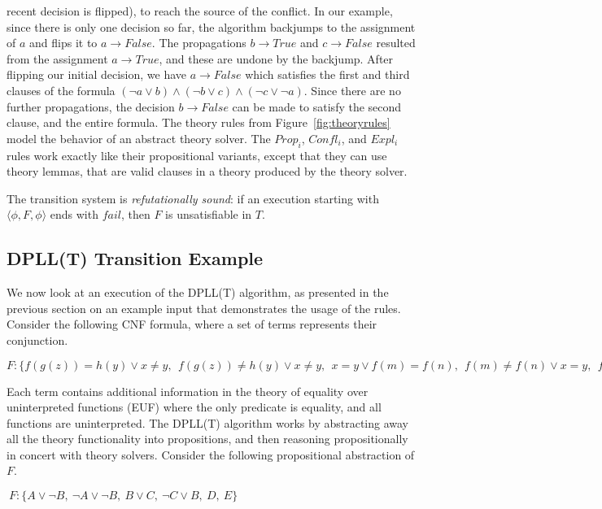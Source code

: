 \documentclass{article}
\begin{document}
	recent decision is flipped), to 
	reach the source of the conflict.
	In our example, since there is only 
	one decision so far, the algorithm
	backjumps to the assignment of 
	$a$ and flips it to $a \to False$. The 
	propagations $b \to True$ and $c \to 
	False$ resulted from the assignment 
	$a \to True$, and these are undone
	by the backjump. After flipping our 
	initial decision, we have $a \to 
	False$ which satisfies
	the first and third clauses of the 
	formula $(\neg a \lor b) \land 
	(\neg b \lor c) \land (\neg c 
	\lor \neg a)$. Since there 
	are no further propagations, the 
	decision $b \to False$ can be made 
	to satisfy the second clause, and the 
	entire formula. The theory rules
	from Figure~\ref{fig:theoryrules} model 
	the behavior of an abstract 
	theory solver. The $Prop_i$, 
	$Confl_i$, and $Expl_i$ rules
	work exactly like their 
	propositional variants, except 
	that they can use theory lemmas, 
	that are valid clauses in a 
	theory produced by the theory
	solver. 
	
	The transition system is 
	\textit{refutationally sound}:
	if an execution starting with 
	$\langle \phi, F, \phi \rangle$ ends 
	with $fail$, then $F$ is 
	unsatisfiable in $T$.
	
	\subsection{DPLL(T) Transition Example}
	\label{sec:transex}
	We now look at an execution of the 
	DPLL(T) algorithm, as presented in the 
	previous section on an example input
	that demonstrates the usage of 
	the rules. Consider the following 
	CNF formula, where a set of terms 
	represents their conjunction.
	\begin{center}
		$ F: \{f(g(z)) = h(y) \lor x \neq y,\ \ 
		f(g(z)) \neq h(y) \lor x \neq y,\ \ 
		x = y \lor f(m) = f(n),\ \ 
		f(m) \neq f(n) \lor x = y,\ \ 
		f(m) = x,\ \ f(n) = y\}$
	\end{center}
	Each term contains 
	additional information in the theory 
	of equality over uninterpreted 
	functions (EUF) where the only 
	predicate is equality, and all
	functions are uninterpreted. The 
	DPLL(T) algorithm
	works by abstracting away all the 
	theory functionality into 
	propositions, and then 
	reasoning propositionally in 
	concert with theory solvers. 
	Consider the following propositional
	abstraction of $F$.
	\begin{center}
		$\ F: \{A \lor \neg B,\ \neg A \lor 
			\neg B,\ B \lor C,\ \neg C 
			\lor B,\ D,\ E\}$
	\end{center}
\end{document}
